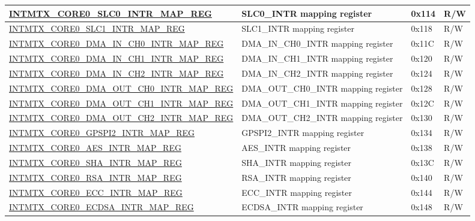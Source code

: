 \begin{longtable}{ | p{10cm} | p{10cm} | p{1.3cm} | p{1cm} | }
\hyperref[regdesc:INTMTXCORE0SLC0INTRMAPREG]{INTMTX\_CORE0\_SLC0\_INTR\_MAP\_REG} & SLC0\_INTR mapping register & 0x114 & R/W  \\ \hline
\hyperref[regdesc:INTMTXCORE0SLC1INTRMAPREG]{INTMTX\_CORE0\_SLC1\_INTR\_MAP\_REG} & SLC1\_INTR mapping register & 0x118 & R/W  \\ \hline
\hyperref[regdesc:INTMTXCORE0DMAINCH0INTRMAPREG]{INTMTX\_CORE0\_DMA\_IN\_CH0\_INTR\_MAP\_REG} & DMA\_IN\_CH0\_INTR mapping register & 0x11C & R/W  \\ \hline
\hyperref[regdesc:INTMTXCORE0DMAINCH1INTRMAPREG]{INTMTX\_CORE0\_DMA\_IN\_CH1\_INTR\_MAP\_REG} & DMA\_IN\_CH1\_INTR mapping register & 0x120 & R/W  \\ \hline
\hyperref[regdesc:INTMTXCORE0DMAINCH2INTRMAPREG]{INTMTX\_CORE0\_DMA\_IN\_CH2\_INTR\_MAP\_REG} & DMA\_IN\_CH2\_INTR mapping register & 0x124 & R/W  \\ \hline
\hyperref[regdesc:INTMTXCORE0DMAOUTCH0INTRMAPREG]{INTMTX\_CORE0\_DMA\_OUT\_CH0\_INTR\_MAP\_REG} & DMA\_OUT\_CH0\_INTR mapping register & 0x128 & R/W  \\ \hline
\hyperref[regdesc:INTMTXCORE0DMAOUTCH1INTRMAPREG]{INTMTX\_CORE0\_DMA\_OUT\_CH1\_INTR\_MAP\_REG} & DMA\_OUT\_CH1\_INTR mapping register & 0x12C & R/W  \\ \hline
\hyperref[regdesc:INTMTXCORE0DMAOUTCH2INTRMAPREG]{INTMTX\_CORE0\_DMA\_OUT\_CH2\_INTR\_MAP\_REG} & DMA\_OUT\_CH2\_INTR mapping register & 0x130 & R/W  \\ \hline
\hyperref[regdesc:INTMTXCORE0GPSPI2INTRMAPREG]{INTMTX\_CORE0\_GPSPI2\_INTR\_MAP\_REG} & GPSPI2\_INTR mapping register & 0x134 & R/W  \\ \hline
\hyperref[regdesc:INTMTXCORE0AESINTRMAPREG]{INTMTX\_CORE0\_AES\_INTR\_MAP\_REG} & AES\_INTR mapping register & 0x138 & R/W  \\ \hline
\hyperref[regdesc:INTMTXCORE0SHAINTRMAPREG]{INTMTX\_CORE0\_SHA\_INTR\_MAP\_REG} & SHA\_INTR mapping register & 0x13C & R/W  \\ \hline
\hyperref[regdesc:INTMTXCORE0RSAINTRMAPREG]{INTMTX\_CORE0\_RSA\_INTR\_MAP\_REG} & RSA\_INTR mapping register & 0x140 & R/W  \\ \hline
\hyperref[regdesc:INTMTXCORE0ECCINTRMAPREG]{INTMTX\_CORE0\_ECC\_INTR\_MAP\_REG} & ECC\_INTR mapping register & 0x144 & R/W  \\ \hline
\hyperref[regdesc:INTMTXCORE0ECDSAINTRMAPREG]{INTMTX\_CORE0\_ECDSA\_INTR\_MAP\_REG} & ECDSA\_INTR mapping register & 0x148 & R/W  \\ \hline

\end{longtable}
